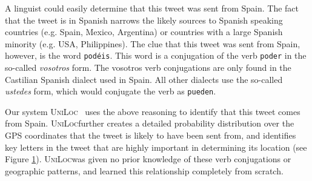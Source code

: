 \documentclass[sigconf,10pt]{acmart}
\newcommand{\str}[1]{\texttt{#1}}
\newcommand{\defn}[1]{\textit{#1}}
\newcommand{\uniloc}{\textsc{UniLoc}}
\begin{document}
\noindent
A linguist could easily determine that this tweet was sent from Spain.
The fact that the tweet is in Spanish narrows the likely sources to 
Spanish speaking countries (e.g. Spain, Mexico, Argentina) 
or countries with a large Spanish minority (e.g. USA, Philippines).
The clue that this tweet was sent from Spain, however, is the word \str{pod\'eis}.
This word is a conjugation of the verb \str{poder} in the so-called \defn{vosotros} form.
The vosotros verb conjugations are only found in the Castilian Spanish dialect used in Spain.
All other dialects use the so-called \defn{ustedes} form, which would conjugate the verb as \str{pueden}.

Our system \uniloc~ uses the above reasoning to identify that this tweet comes from Spain.
\uniloc further creates a detailed probability distribution over the GPS coordinates that the tweet is likely to have been sent from,
and identifies key letters in the tweet that are highly important in determining its location 
(see Figure \ref{fig:poder}).
\uniloc was given no prior knowledge of these verb conjugations or geographic patterns,
and learned this relationship completely from scratch.


\begin{figure}
    \caption{}
    \label{fig:poder}
\end{figure}

\end{document}
